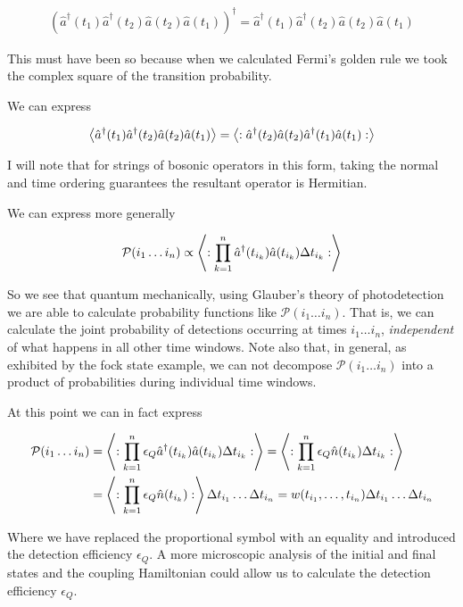 \documentclass[12pt]{article}
\begin{document}
\begin{align}
\left(\hat{a}^{\dag}(t_1)\hat{a}^{\dag}(t_2)\hat{a}(t_2)\hat{a}(t_1)\right)^{\dag} = \hat{a}^{\dag}(t_1)\hat{a}^{\dag}(t_2)\hat{a}(t_2)\hat{a}(t_1)
\end{align}

This must have been so because when we calculated Fermi's golden rule we took the complex square of the transition probability.

We can express

\begin{align}
\Braket{\hat{a}^{\dag}(t_1)\hat{a}^{\dag}(t_2)\hat{a}(t_2)\hat{a}(t_1)} = \Braket{:\hat{a}^{\dag}(t_2)\hat{a}(t_2) \hat{a}^{\dag}(t_1)\hat{a}(t_1):}
\end{align}

I will note that for strings of bosonic operators in this form, taking the normal and time ordering guarantees the resultant operator is Hermitian. 

We can express more generally

\begin{align}
\mathcal{P}(i_1 \ldots i_n) \propto \Braket{:\prod_{k=1}^n \hat{a}^{\dag}(t_{i_k})\hat{a}(t_{i_k})\Delta t_{i_k} :}
\end{align}

So we see that quantum mechanically, using Glauber's theory of photodetection we are able to calculate probability functions like $\mathcal{P}(i_1\ldots i_n)$. That is, we can calculate the joint probability of detections occurring at times $i_1 \ldots i_n$, \textit{independent} of what happens in all other time windows. Note also that, in general, as exhibited by the fock state example, we can not decompose $\mathcal{P}(i_1 \ldots i_n)$ into a product of probabilities during individual time windows. 

At this point we can in fact express

\begin{align}
\mathcal{P}(i_1 \ldots i_n) &= \Braket{:\prod_{k=1}^n \epsilon_Q \hat{a}^{\dag}(t_{i_k})\hat{a}(t_{i_k})\Delta t_{i_k} :} = \Braket{:\prod_{k=1}^n \epsilon_Q \hat{n}(t_{i_k})\Delta t_{i_k} :}\\
&= \Braket{:\prod_{k=1}^n \epsilon_Q \hat{n}(t_{i_k}):} \Delta t_{i_1} \ldots \Delta t_{i_n} = w(t_{i_1},\ldots ,t_{i_{n}}) \Delta t_{i_1} \ldots \Delta t_{i_n}
\end{align}

Where we have replaced the proportional symbol with an equality and introduced the detection efficiency $\epsilon_Q$. A more microscopic analysis of the initial and final states and the coupling Hamiltonian could allow us to calculate the detection efficiency $\epsilon_Q$.
\end{document}

